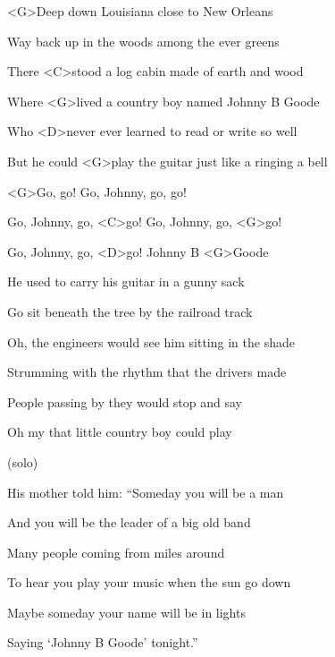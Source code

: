 
\zs
<G>Deep down Louisiana close to New Orleans

Way back up in the woods among the ever greens

There <C>stood a log cabin made of earth and wood

Where <G>lived a country boy named Johnny B Goode

Who <D>never ever learned to read or write so well

But he could <G>play the guitar just like a ringing a bell
\ks

\zr
<G>Go, go! Go, Johnny, go, go!

Go, Johnny, go, <C>go! Go, Johnny, go, <G>go!

Go, Johnny, go, <D>go! Johnny B <G>Goode
\kr

\zs
He used to carry his guitar in a gunny sack

Go sit beneath the tree by the railroad track

Oh, the engineers would see him sitting in the shade

Strumming with the rhythm that the drivers made

People passing by they would stop and say

Oh my that little country boy could play
\ks

\zr\kr

\zs (solo) \ks 

\zs
His mother told him: ``Someday you will be a man

And you will be the leader of a big old band

Many people coming from miles around

To hear you play your music when the sun go down

Maybe someday your name will be in lights

Saying `Johnny B Goode' tonight.''
\ks

\zr\kr
\kp
